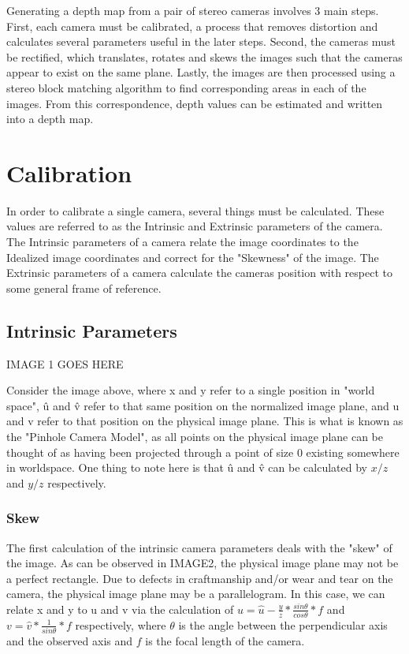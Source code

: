 Generating a depth map from a pair of stereo cameras involves 3 main steps.  First, each camera must be calibrated, a process that removes distortion and calculates several parameters useful in the later steps.  Second, the cameras must be rectified, which translates, rotates and skews the images such that the cameras appear to exist on the same plane.  Lastly, the images are then processed using a stereo block matching algorithm to find corresponding areas in each of the images.  From this correspondence, depth values can be estimated and written into a depth map.

\section{Calibration}
In order to calibrate a single camera, several things must be calculated.  These values are referred to as the Intrinsic and Extrinsic parameters of the camera.  The Intrinsic parameters of a camera relate the image coordinates to the Idealized image coordinates and correct for the "Skewness" of the image. The Extrinsic parameters of a camera calculate the cameras position with respect to some general frame of reference.


\subsection{Intrinsic Parameters}
IMAGE 1 GOES HERE

Consider the image above, where x and y refer to a single position in "world space", \^{u} and \^{v} refer to that same position on the normalized image plane, and u and v refer to that position on the physical image plane.  This is what is known as the "Pinhole Camera Model", as all points on the physical image plane can be thought of as having been projected through a point of size 0 existing somewhere in worldspace.  One thing to note here is that \^{u} and \^{v} can be calculated by $x/z$ and $y/z$ respectively.
\subsubsection{Skew}
The first calculation of the intrinsic camera parameters deals with the "skew" of the image.  As can be observed in IMAGE2, the physical image plane may not be a perfect rectangle.  Due to defects in craftmanship and/or wear and tear on the camera, the physical image plane may be a parallelogram.  In this case, we can relate x and y to u and v via the calculation of $u=\hat{u}-\frac{y}{z} * \frac{sin  \theta }{ cos \theta} * f$ and $v=\hat{v}*\frac{1}{sin \theta} * f$ respectively, where $\theta$ is the angle between the perpendicular axis and the observed axis and $f$ is the focal length of the camera.

